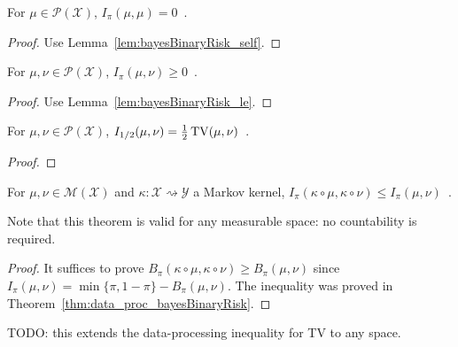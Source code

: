 \begin{lemma}
  \label{lem:deGrootInfo_self}
  For $\mu \in \mathcal P(\mathcal X)$, $I_\pi(\mu, \mu) = 0$~.
\end{lemma}

\begin{proof}%
{}
Use Lemma~\ref{lem:bayesBinaryRisk_self}.
\end{proof}

\begin{lemma}
  \label{lem:deGrootInfo_nonneg}
  For $\mu, \nu \in \mathcal P(\mathcal X)$, $I_\pi(\mu, \nu) \ge 0$~.
\end{lemma}

\begin{proof}%
{}
Use Lemma~\ref{lem:bayesBinaryRisk_le}.
\end{proof}

\begin{lemma}
  \label{lem:deGrootInfo_half}
  For $\mu, \nu \in \mathcal P(\mathcal X)$, $I_{1/2}(\mu, \nu) = \frac{1}{2}\operatorname{TV}(\mu, \nu)$~.
\end{lemma}

\begin{proof}%
\uses{}

\end{proof}

\begin{theorem}
  \label{thm:data_proc_deGrootInfo}
  For $\mu, \nu \in \mathcal M(\mathcal X)$ and $\kappa : \mathcal X \rightsquigarrow \mathcal Y$ a Markov kernel, $I_\pi(\kappa \circ \mu, \kappa \circ \nu) \le I_\pi(\mu, \nu)$~.
\end{theorem}

Note that this theorem is valid for any measurable space: no countability is required.

\begin{proof}%
{}
It suffices to prove $B_\pi(\kappa \circ \mu, \kappa \circ \nu) \ge B_\pi(\mu, \nu)$ since $I_\pi(\mu, \nu) = \min\{\pi, 1 - \pi\} - B_\pi(\mu, \nu)$.
The inequality was proved in Theorem~\ref{thm:data_proc_bayesBinaryRisk}.
\end{proof}

TODO: this extends the data-processing inequality for TV to any space.

